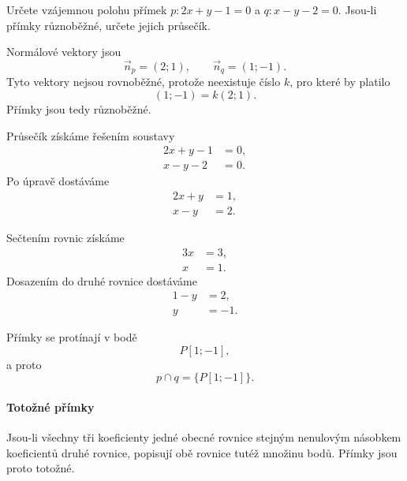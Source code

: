 \begin{example}\label{exa:Intersecting_general_lines}
    Určete vzájemnou polohu přímek $p:2x+y-1=0$ a $q:x-y-2=0$.
    Jsou-li přímky různoběžné, určete jejich průsečík.

    Normálové vektory jsou
    \[
        \vec{n}_p=(2;1),
        \qquad
        \vec{n}_q=(1;-1).
    \]
    Tyto vektory nejsou rovnoběžné, protože neexistuje číslo $k$, pro
    které by platilo
    \[
        (1;-1)=k(2;1).
    \]
    Přímky jsou tedy různoběžné.

    Průsečík získáme řešením soustavy
    \begin{align*}
        2x+y-1&=0,\\
        x-y-2&=0.
    \end{align*}
    Po úpravě dostáváme
    \begin{align*}
        2x+y&=1,\\
        x-y&=2.
    \end{align*}

    Sečtením rovnic získáme
    \begin{align*}
        3x&=3,\\
        x&=1.
    \end{align*}
    Dosazením do druhé rovnice dostáváme
    \begin{align*}
        1-y&=2,\\
        y&=-1.
    \end{align*}

    Přímky se protínají v bodě
    \[
        P[1;-1],
    \]
    a proto
    \[
        p\cap q=\{P[1;-1]\}.
    \]
\end{example}

\paragraph{Totožné přímky}
\label{subsubsec:Coincident_general_lines}

Jsou-li všechny tři koeficienty jedné obecné rovnice stejným
nenulovým násobkem koeficientů druhé rovnice, popisují obě rovnice
tutéž množinu bodů. Přímky jsou proto totožné.


